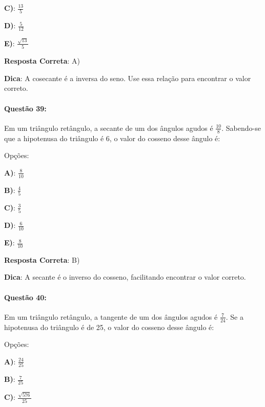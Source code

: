 \documentclass{article}
\begin{document}
\textbf{C)}: \( \frac{13}{5} \) 

\textbf{D)}: \( \frac{5}{12} \) 

\textbf{E)}: \( \frac{\sqrt{13}}{5} \) 

\vspace{\baselineskip}\textbf{Resposta Correta}: A)

\vspace{\baselineskip}\textbf{Dica}: A cosecante é a inversa do seno. Use essa relação para encontrar o valor correto.

\paragraph{Questão 39:}
{Em um triângulo retângulo, a secante de um dos ângulos agudos é \( \frac{10}{8} \). Sabendo-se que a hipotenusa do triângulo é 6, o valor do cosseno desse ângulo é:}

\vspace{\baselineskip}Opções:

\vspace{\baselineskip}\textbf{A)}: \( \frac{8}{10} \) 

\textbf{B)}: \( \frac{4}{5} \) 

\textbf{C)}: \( \frac{3}{5} \) 

\textbf{D)}: \( \frac{6}{10} \) 

\textbf{E)}: \( \frac{8}{10} \) 

\vspace{\baselineskip}\textbf{Resposta Correta}: B)

\vspace{\baselineskip}\textbf{Dica}: A secante é o inverso do cosseno, facilitando encontrar o valor correto.

\paragraph{Questão 40:}
{Em um triângulo retângulo, a tangente de um dos ângulos agudos é \( \frac{7}{24} \). Se a hipotenusa do triângulo é de 25, o valor do cosseno desse ângulo é:}

\vspace{\baselineskip}Opções:

\vspace{\baselineskip}\textbf{A)}: \( \frac{24}{25} \) 

\textbf{B)}: \( \frac{7}{25} \) 

\textbf{C)}: \( \frac{\sqrt{576}}{25} \) 
\end{document}
